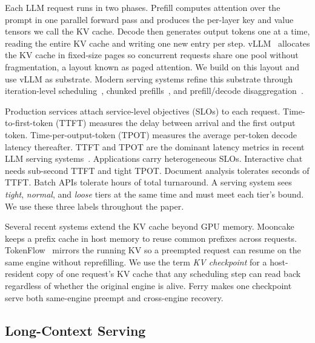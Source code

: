 Each LLM request runs in two phases. Prefill computes attention over the prompt in one parallel forward pass and produces the per-layer key and value tensors we call the KV cache. Decode then generates output tokens one at a time, reading the entire KV cache and writing one new entry per step. vLLM~\cite{vllm} allocates the KV cache in fixed-size pages so concurrent requests share one pool without fragmentation, a layout known as paged attention. We build on this layout and use vLLM as substrate. Modern serving systems refine this substrate through iteration-level scheduling~\cite{orca}, chunked prefills~\cite{sarathi_serve}, and prefill/decode disaggregation~\cite{distserve,splitwise}.

Production services attach service-level objectives (SLOs) to each request. Time-to-first-token (TTFT) measures the delay between arrival and the first output token. Time-per-output-token (TPOT) measures the average per-token decode latency thereafter. TTFT and TPOT are the dominant latency metrics in recent LLM serving systems~\cite{distserve,fastserve,jitserve}. Applications carry heterogeneous SLOs. Interactive chat needs sub-second TTFT and tight TPOT. Document analysis tolerates seconds of TTFT. Batch APIs tolerate hours of total turnaround. A serving system sees \emph{tight}, \emph{normal}, and \emph{loose} tiers at the same time and must meet each tier's bound. We use these three labels throughout the paper.

Several recent systems extend the KV cache beyond GPU memory. Mooncake~\cite{mooncake} keeps a prefix cache in host memory to reuse common prefixes across requests. TokenFlow~\cite{tokenflow} mirrors the running KV so a preempted request can resume on the same engine without reprefilling. We use the term \emph{KV checkpoint} for a host-resident copy of one request's KV cache that any scheduling step can read back regardless of whether the original engine is alive. Ferry makes one checkpoint serve both same-engine preempt and cross-engine recovery.

\subsection{Long-Context Serving}


